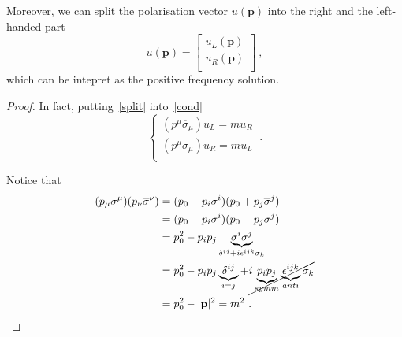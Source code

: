     Moreover, we can split the polarisation vector $u (\mathbf p)$ into the right and the left-handed part 
    \begin{equation}\label{split}
        u (\mathbf p) = \begin{bmatrix}
            u_L (\mathbf p) \\ u_R (\mathbf p) \\
        \end{bmatrix} ~,
    \end{equation}
    which can be intepret as the positive frequency solution. 
    \begin{proof}
        In fact, putting~\eqref{split} into~\eqref{cond} 
        \begin{equation}\label{proof4}
            \begin{cases}
                (p^\mu \overline \sigma_\mu) u_L = m u_R \\
                (p^\mu \sigma_\mu) u_R = m u_L \\
            \end{cases} ~.
        \end{equation}

        Notice that 
        \begin{equation*}
        \begin{aligned}
            (p_\mu \sigma^\mu) (p_\nu \overline \sigma^\nu) & = (p_0 + p_i \sigma^i) (p_0 + p_j \overline \sigma^j) \\ & = (p_0 + p_i \sigma^i) (p_0 - p_j \sigma^j) \\ & = p_0^2 - p_i p_j \underbrace{\sigma^i \sigma^j}_{\delta^{ij} + i \epsilon^{ijk} \sigma_k} \\ & = p_0^2 - p_i p_j \underbrace{\delta^{ij}}_{i = j} + \cancel{i \underbrace{p_i p_j}_{symm} \underbrace{\epsilon^{ijk}}_{anti} \sigma_k} \\ & = p_0^2 - |\mathbf p|^2 = m^2 ~.
        \end{aligned}
        \end{equation*}


\end{proof}

